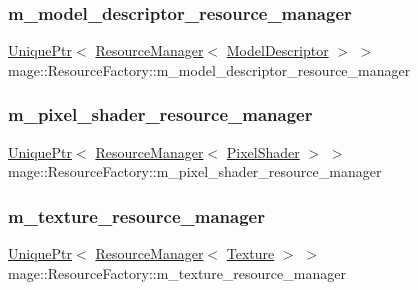 \subsubsection{\texorpdfstring{m\+\_\+model\+\_\+descriptor\+\_\+resource\+\_\+manager}{m\_model\_descriptor\_resource\_manager}}
{\footnotesize\ttfamily \hyperlink{namespacemage_a8c307fbcc33bce9b7f2aa4c26c3b95cf}{Unique\+Ptr}$<$ \hyperlink{classmage_1_1_resource_manager}{Resource\+Manager}$<$ \hyperlink{classmage_1_1_model_descriptor}{Model\+Descriptor} $>$ $>$ mage\+::\+Resource\+Factory\+::m\+\_\+model\+\_\+descriptor\+\_\+resource\+\_\+manager\hspace{0.3cm}{\ttfamily [private]}}

\hypertarget{classmage_1_1_resource_factory_affcd4a93cd82979beca8c7daab7c3501}{}\label{classmage_1_1_resource_factory_affcd4a93cd82979beca8c7daab7c3501} 
\subsubsection{\texorpdfstring{m\+\_\+pixel\+\_\+shader\+\_\+resource\+\_\+manager}{m\_pixel\_shader\_resource\_manager}}
{\footnotesize\ttfamily \hyperlink{namespacemage_a8c307fbcc33bce9b7f2aa4c26c3b95cf}{Unique\+Ptr}$<$ \hyperlink{classmage_1_1_resource_manager}{Resource\+Manager}$<$ \hyperlink{classmage_1_1_pixel_shader}{Pixel\+Shader} $>$ $>$ mage\+::\+Resource\+Factory\+::m\+\_\+pixel\+\_\+shader\+\_\+resource\+\_\+manager\hspace{0.3cm}{\ttfamily [private]}}

\hypertarget{classmage_1_1_resource_factory_a88e236e06faf339e2889bed8b817a196}{}\label{classmage_1_1_resource_factory_a88e236e06faf339e2889bed8b817a196} 
\subsubsection{\texorpdfstring{m\+\_\+texture\+\_\+resource\+\_\+manager}{m\_texture\_resource\_manager}}
{\footnotesize\ttfamily \hyperlink{namespacemage_a8c307fbcc33bce9b7f2aa4c26c3b95cf}{Unique\+Ptr}$<$ \hyperlink{classmage_1_1_resource_manager}{Resource\+Manager}$<$ \hyperlink{classmage_1_1_texture}{Texture} $>$ $>$ mage\+::\+Resource\+Factory\+::m\+\_\+texture\+\_\+resource\+\_\+manager\hspace{0.3cm}{\ttfamily [private]}}

